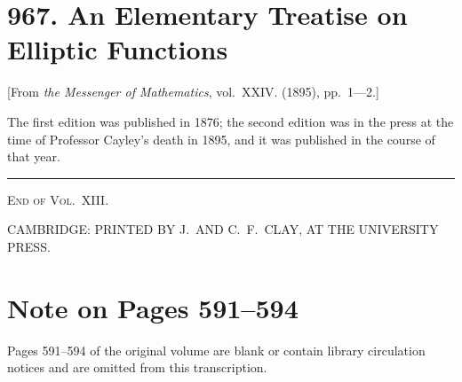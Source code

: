 \documentclass[12pt,a4paper]{article}
\theoremstyle{definition}
\begin{document}
\newpage
\section{967. An Elementary Treatise on Elliptic Functions}
\label{sec:967}

[From \textit{the Messenger of Mathematics}, vol.~XXIV. (1895), pp.~1---2.]
\bigskip

The first edition was published in 1876; the second edition was in the press at the time of Professor Cayley's death in 1895, and it was published in the course of that year.

\bigskip
\begin{center}
\rule{0.5\textwidth}{0.4pt}
\end{center}

\begin{center}
\textsc{End of Vol.~XIII.}
\end{center}

\bigskip
\begin{center}
CAMBRIDGE: PRINTED BY J.~AND C.~F.~CLAY, AT THE UNIVERSITY PRESS.
\end{center}

\newpage
\section*{Note on Pages 591--594}

Pages 591--594 of the original volume are blank or contain library circulation notices and are omitted from this transcription.
\end{document}

